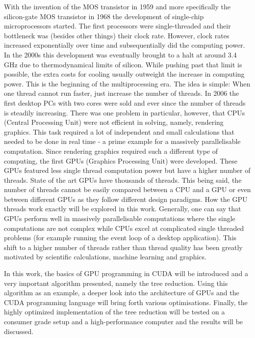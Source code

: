 With the invention of the MOS transistor in 1959 and more specifically the silicon-gate MOS transistor in 1968 the development of single-chip microprocessors started.
The first processors were single-threaded and their bottleneck was (besides other things) their clock rate.
However, clock rates increased exponentially over time and subsequentially did the computing power.
In the 2000s this development was eventually brought to a halt at around 3.4 GHz due to thermodynamical limits of silicon. 
While pushing past that limit is possible, the extra costs for cooling usually outweight the increase in computing power.
This is the beginning of the multiprocessing era. 
The idea is simple: When one thread cannot run faster, just increase the number of threads.
In 2006 the first desktop PCs with two cores were sold and ever since the number of threads is steadily increasing.
There was one problem in particular, however, that CPUs (Central Processing Unit) were not efficient in solving, namely, rendering graphics.
This task required a lot of independent and small calculations that needed to be done in real time - a prime example for a massively parallelisable computation.
Since rendering graphics required such a different type of computing, the first GPUs (Graphics Processing Unit) were developed.
These GPUs featured less single thread computation power but have a higher number of threads.
State of the art GPUs have thousands of threads.
This being said, the number of threads cannot be easily compared between a CPU and a GPU or even between different GPUs as they follow different design paradigms.
How the GPU threads work exactly will be explored in this work.
Generally, one can say that GPUs perform well in massively parallelisable computations where the single computations are not complex while CPUs excel at complicated single threaded problems (for example running the event loop of a desktop application).
This shift to a higher number of threads rather than thread quality has been greatly motivated by scientific calculations, machine learning and graphics.

In this work, the basics of GPU programming in CUDA will be introduced and a very important algorithm presented, namely the tree reduction.
Using this algorithm as an example, a deeper look into the architecture of GPUs and the CUDA programming language will bring forth various optimisations.
Finally, the highly optimized implementation of the tree reduction will be tested on a consumer grade setup and a high-performance computer and the results will be discussed.


